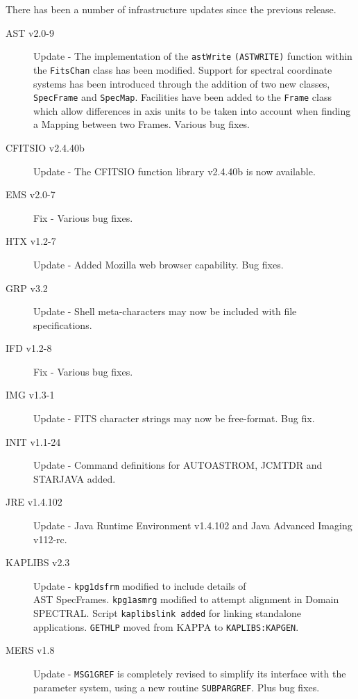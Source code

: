 \documentclass[twoside,11pt]{article}
\renewcommand{\_}{\texttt{\symbol{95}}}
\begin{document}
There has been a number of infrastructure updates since the previous
release.

\begin{description}
\item[AST v2.0-9] Update - The implementation of the \texttt{astWrite} \texttt{(AST\_WRITE)}
function within the \texttt{FitsChan} class has been modified. Support for spectral
coordinate systems has been introduced through the addition of two new classes,
\texttt{SpecFrame} and \texttt{SpecMap}. Facilities have been added to the \texttt{Frame}
class which allow differences in axis units to be taken into account when finding a Mapping
between two Frames. Various bug fixes.
\item[CFITSIO v2.4.40b] Update - The CFITSIO function library v2.4.40b is now
available.

\item[EMS v2.0-7] Fix - Various bug fixes.

\item[HTX v1.2-7] Update - Added Mozilla web browser capability. Bug fixes.

\item[GRP v3.2] Update - Shell meta-characters may now be included with file
specifications.

\item[IFD v1.2-8] Fix - Various bug fixes.

\item[IMG v1.3-1] Update - FITS character strings may now be free-format. Bug
fix.

\item[INIT v1.1-24] Update - Command definitions for AUTOASTROM, JCMTDR
and STARJAVA added.

\item[JRE v1.4.1\_02] Update - Java Runtime Environment v1.4.1\_02 and Java
Advanced Imaging v1\_1\_2-rc.

\item[KAPLIBS v2.3] Update - \texttt{kpg1\_dsfrm} modified to include details of \\
AST SpecFrames. \texttt{kpg1\_asmrg} modified to attempt alignment in Domain SPECTRAL.
Script \texttt{kaplibs\_link added} for linking standalone applications. \texttt{GETHLP}
moved from KAPPA to \texttt{KAPLIBS:KAPGEN}.

\item[MERS v1.8] Update - \texttt{MSG1\_GREF} is completely revised to simplify its interface
with the parameter system, using a new routine \texttt{SUBPAR\_GREF}. Plus bug fixes.


\end{description}
\end{document}
